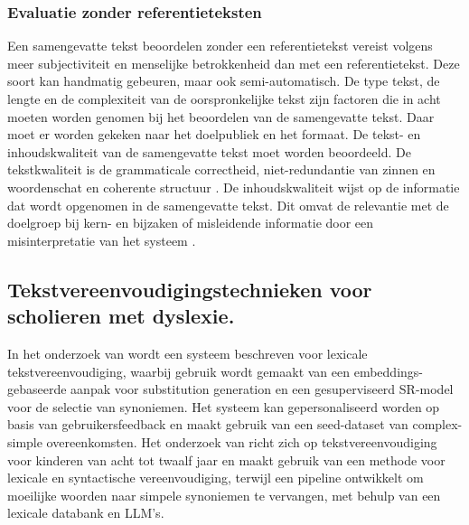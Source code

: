 \subsubsection{Evaluatie zonder referentieteksten}
Een samengevatte tekst beoordelen zonder een referentietekst vereist volgens \textcite{Steinberger2009} meer subjectiviteit en menselijke betrokkenheid dan met een referentietekst. Deze soort kan handmatig gebeuren, maar ook semi-automatisch. De type tekst, de lengte en de complexiteit van de oorspronkelijke tekst zijn factoren die in acht moeten worden genomen bij het beoordelen van de samengevatte tekst. Daar moet er worden gekeken naar het doelpubliek en het formaat. De tekst- en inhoudskwaliteit van de samengevatte tekst moet worden beoordeeld. De tekstkwaliteit is de grammaticale correctheid, niet-redundantie van zinnen en woordenschat en coherente structuur \autocite{McCombes2022}. De inhoudskwaliteit wijst op de informatie dat wordt opgenomen in de samengevatte tekst. Dit omvat de relevantie met de doelgroep bij kern- en bijzaken of misleidende informatie door een misinterpretatie van het systeem \autocite{McCombes2022}.


\subsection{Tekstvereenvoudigingstechnieken voor scholieren met dyslexie.}

In het onderzoek van \textcite{Bingel2018} wordt een systeem beschreven voor lexicale tekstvereenvoudiging, waarbij gebruik wordt gemaakt van een embeddings-gebaseerde aanpak voor substitution generation en een gesuperviseerd SR-model voor de selectie van synoniemen. Het systeem kan gepersonaliseerd worden op basis van gebruikersfeedback en maakt gebruik van een seed-dataset van complex-simple overeenkomsten. Het onderzoek van \textcite{DeBelder2010} richt zich op tekstvereenvoudiging voor kinderen van acht tot twaalf jaar en maakt gebruik van een methode voor lexicale en syntactische vereenvoudiging, terwijl \textcite{Bulte2018} een pipeline ontwikkelt om moeilijke woorden naar simpele synoniemen te vervangen, met behulp van een lexicale databank en LLM's.


